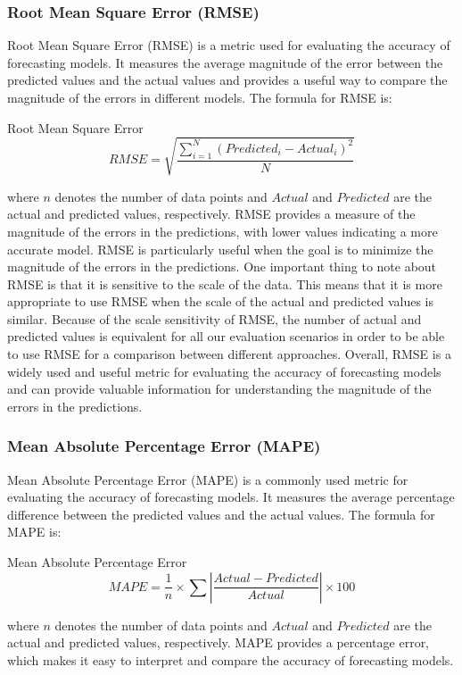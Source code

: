     \subsubsection{Root Mean Square Error (RMSE)}
    \label{sec:rmse-metrics-evaluation}

      Root Mean Square Error (RMSE) \cite{chaiRootMeanSquare2014} is a metric used for evaluating the accuracy of forecasting models. It measures the average magnitude of the error between the predicted values and the actual values and provides a useful way to compare the magnitude of the errors in different models.
      The formula for RMSE is:
      \begin{pabox}{Root Mean Square Error}
        $$RMSE = \sqrt{\frac{\sum_{i = 1}^{N}\left(Predicted_i - Actual_i\right)^2}{N}}$$
      \end{pabox}
      where $n$ denotes the number of data points and $Actual$ and $Predicted$ are the actual and predicted values, respectively.
      RMSE provides a measure of the magnitude of the errors in the predictions, with lower values indicating a more accurate model. 
      RMSE is particularly useful when the goal is to minimize the magnitude of the errors in the predictions.
      One important thing to note about RMSE is that it is sensitive to the scale of the data. This means that it is more appropriate to use RMSE when the scale of the actual and predicted values is similar.
      Because of the scale sensitivity of RMSE, the number of actual and predicted values is equivalent for all our evaluation scenarios in order to be able to use RMSE for a comparison between different approaches.
      Overall, RMSE is a widely used and useful metric for evaluating the accuracy of forecasting models and can provide valuable information for understanding the magnitude of the errors in the predictions.

      
    \subsubsection{Mean Absolute Percentage Error (MAPE)}
    \label{sec:mape-metrics-evaluation}

      Mean Absolute Percentage Error (MAPE) \cite{demyttenaereMeanAbsolutePercentage2016} is a commonly used metric for evaluating the accuracy of forecasting models. It measures the average percentage difference between the predicted values and the actual values.
      The formula for MAPE is:

      \begin{pabox}{Mean Absolute Percentage Error}
        $$MAPE = \frac{1}{n} \times \sum \left|\frac{Actual - Predicted}{Actual}\right| \times 100$$
      \end{pabox}
      where $n$ denotes the number of data points and $Actual$ and $Predicted$ are the actual and predicted values, respectively.
      MAPE provides a percentage error, which makes it easy to interpret and compare the accuracy of forecasting models. 
      
